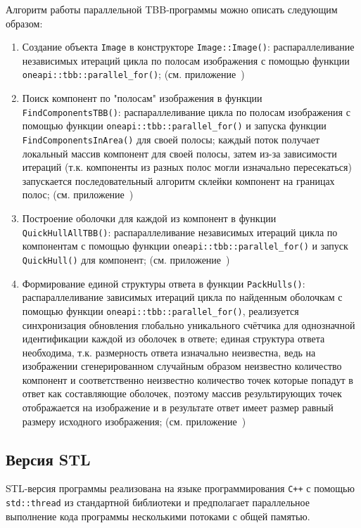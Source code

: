 \documentclass[12pt]{article}
\begin{document}
Алгоритм работы параллельной TBB-программы можно описать следующим образом:

\begin{enumerate}
    \item Создание объекта \texttt{Image} в конструкторе \texttt{Image::Image()}: распараллеливание независимых итераций цикла по полосам изображения с помощью функции \texttt{oneapi::tbb::parallel\_for()}; (см. приложение~)
    \item Поиск компонент по "полосам" изображения в функции \texttt{FindComponentsTBB()}: распараллеливание цикла по полосам изображения с помощью функции \texttt{oneapi::tbb::parallel\_for()} и запуска функции \texttt{FindComponentsInArea()} для своей полосы; каждый поток получает локальный массив компонент для своей полосы, затем из-за зависимости итераций (т.к. компоненты из разных полос могли изначально пересекаться) запускается последовательный алгоритм склейки компонент на границах полос; (см. приложение~)
    \item Построение оболочки для каждой из компонент в функции \texttt{QuickHullAllTBB()}: распараллеливание независимых итераций цикла по компонентам с помощью функции \texttt{oneapi::tbb::parallel\_for()} и запуск \texttt{QuickHull()} для компонент; (см. приложение~)
    \item Формирование единой структуры ответа в функции \texttt{PackHulls()}: распараллеливание зависимых итераций цикла по найденным оболочкам с помощью функции \texttt{oneapi::tbb::parallel\_for()}, реализуется синхронизация обновления глобально уникального счётчика для однозначной идентификации каждой из оболочек в ответе; единая структура ответа необходима, т.к. размерность ответа изначально неизвестна, ведь на изображении сгенерированном случайным образом неизвестно количество компонент и соответственно неизвестно количество точек которые попадут в ответ как составляющие оболочек, поэтому массив результирующих точек отображается на изображение и в результате ответ имеет размер равный размеру исходного изображения; (см. приложение~)
\end{enumerate}

\newpage

\subsection{Версия STL}

STL-версия программы реализована на языке программирования \texttt{C++} с помощью \texttt{std::thread} из стандартной библиотеки и предполагает параллельное выполнение кода программы несколькими потоками с общей памятью.
\end{document}
